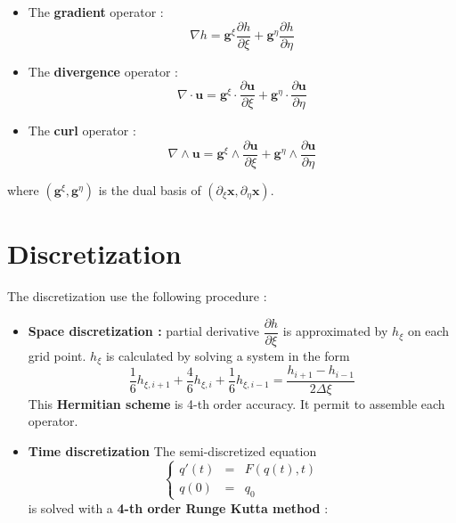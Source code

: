 \documentclass{sciposter}
\begin{document}
\begin{multicols}{2}
\begin{itemize}
\item The \textbf{gradient} operator :
\begin{equation}
\nabla h = \mathbf{g}^{\xi} \dfrac{\partial h}{\partial \xi} + \mathbf{g}^{\eta} \dfrac{\partial h}{\partial \eta}
\end{equation}
\item The \textbf{divergence} operator :
\begin{equation}
\nabla \cdot \mathbf{u} = \mathbf{g}^{\xi} \cdot \dfrac{\partial \mathbf{u}}{\partial \xi} + \mathbf{g}^{\eta} \cdot \dfrac{\partial \mathbf{u}}{\partial \eta}
\end{equation}
\item The \textbf{curl} operator :
\begin{equation}
\nabla \wedge \mathbf{u} = \mathbf{g}^{\xi} \wedge \dfrac{\partial \mathbf{u}}{\partial \xi} + \mathbf{g}^{\eta} \wedge \dfrac{\partial \mathbf{u}}{\partial \eta}
\end{equation}
\end{itemize}

where $(\mathbf{g}^{\xi}, \mathbf{g}^{\eta})$ is the dual basis of $(\partial_{\xi} \mathbf{x},\partial_{\eta} \mathbf{x})$.

\vspace{.8cm}

\section{Discretization}
The discretization use the following procedure \cite{C2015} :
\begin{itemize}
\item \textbf{Space discretization :} partial derivative $\dfrac{\partial h}{\partial \xi}$ is approximated by $h_{\xi}$ on each grid point. $h_{\xi}$ is calculated by solving a system in the form 
\begin{equation}
\dfrac{1}{6} h_{\xi,i+1} + \dfrac{4}{6} h_{\xi,i} + \dfrac{1}{6} h_{\xi,i-1} = \dfrac{h_{i+1} - h_{i-1}}{2 \Delta \xi}
\end{equation}
This \textbf{Hermitian scheme} is 4-th order accuracy. It permit to assemble each operator.

\item \textbf{Time discretization} The semi-discretized equation
\begin{equation}
\left\lbrace
\begin{array}{rcl}
q'(t) &=& F(q(t),t)\\
q(0)  &=& q_0 
\end{array}
\right.
\end{equation}
is solved with a \textbf{4-th order Runge Kutta method} :


\end{itemize}
\end{multicols}
\end{document}
